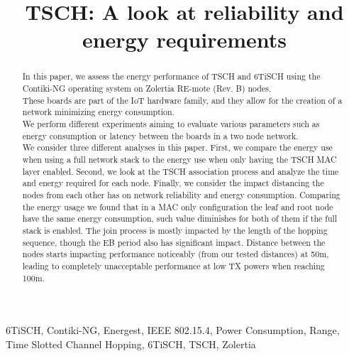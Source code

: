 \documentclass[conference]{IEEEtran}
\renewcommand\_{\textunderscore\allowbreak}
\begin{document}
\title{TSCH: A look at reliability and energy requirements}

\author{
\and
{}
}

\maketitle

\begin{abstract}
In this paper, we assess the energy performance of TSCH and 6TiSCH using the Contiki-NG operating system on Zolertia RE-mote (Rev. B) nodes.\\
These boards are part of the IoT hardware family, and they allow for the creation of a network minimizing energy consumption.\\
We perform different experiments aiming to evaluate various parameters such as energy consumption or latency between the boards in a two node network.\\
We consider three different analyses in this paper. First, we compare the energy use when using a full network stack to the energy use when only having the TSCH MAC layer enabled. Second, we look at the TSCH association process and analyze the time and energy required for each node. Finally, we consider the impact distancing the nodes from each other has on network reliability and energy consumption. 
Comparing the energy usage we found that in a MAC only configuration the leaf and root node have the same energy consumption, such value diminishes for both of them if the full stack is enabled. 
The join process is mostly impacted by the length of the hopping sequence, though the EB period also has significant impact. Distance between the nodes starts impacting performance noticeably (from our tested distances) at 50m, leading to completely unacceptable performance at low TX powers when reaching 100m.
\end{abstract}

\begin{IEEEkeywords}
6TiSCH, Contiki-NG, Energest, IEEE 802.15.4, Power Consumption, Range, Time Slotted Channel Hopping, 6TiSCH, TSCH, Zolertia
\end{IEEEkeywords}
\end{document}
